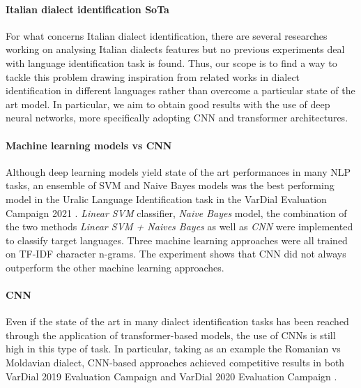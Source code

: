 \documentclass[11pt]{article}
\begin{document}
        \paragraph{Italian dialect identification SoTa}
        For what concerns Italian dialect identification, there are several researches working on analysing Italian dialects features \cite{DBLP:journals/corr/abs-2010-05993} but no previous experiments deal with language identification task is found. Thus, our scope is to find a way to tackle this problem drawing inspiration from related works in dialect identification in different languages rather than overcome a particular state of the art model. In particular, we aim to obtain good results with the use of deep neural networks, more specifically adopting CNN and transformer architectures.
        \paragraph{Machine learning models vs CNN}
        Although deep learning models yield state of the art performances in many NLP tasks, an ensemble of SVM and Naive Bayes models was the best performing model in the Uralic Language Identification task in the VarDial Evaluation Campaign 2021 \cite{ceolin-2021-comparing}. \emph{Linear SVM} classifier, \emph{Naive Bayes} model, the combination of the two methods \emph{Linear SVM + Naives Bayes} as well as \emph{CNN} were implemented to  classify target languages. Three machine learning approaches were all trained on TF-IDF character n-grams. The experiment shows that CNN did not always outperform the other machine learning approaches.

        \paragraph{CNN}
        Even if the state of the art in many dialect identification tasks has been reached through the application of transformer-based models, the use of CNNs is still high in this type of task. In particular, taking as an example the Romanian vs Moldavian dialect, CNN-based approaches achieved competitive results in both VarDial 2019 Evaluation Campaign \cite{tudoreanu-2019-dteam} and VarDial 2020 Evaluation Campaign \cite{Rebeja2020ADS}.%
        
\end{document}
